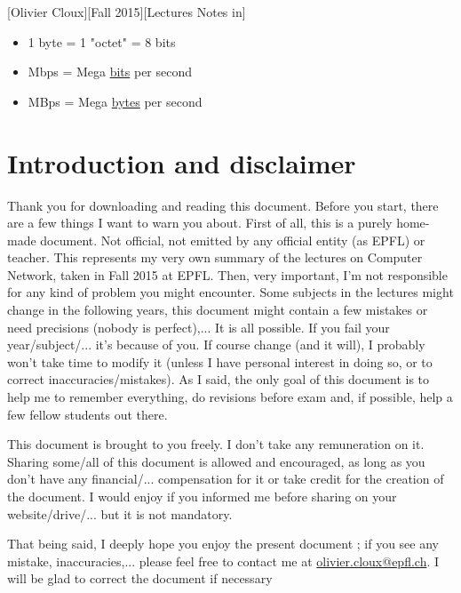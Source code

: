 \documentclass[12pt,a4paper]{article}
\begin{document}
[Olivier Cloux][Fall 2015][Lectures Notes in]
\newpage
\begin{multicols}{2}
	\tableofcontents
\end{multicols}
\setcounter{section}{-1}
\begin{boite}
	\begin{center}
	\end{center}
	\begin{itemize}
		\item 1 byte = 1 "octet" = 8 bits
		\item Mbps = Mega \uline{bits} per second
		\item MBps = Mega \uline{bytes} per second
	\end{itemize}
\end{boite}

\section{Introduction and disclaimer}
Thank you for downloading and reading this document. Before you start, there are a few things I want to warn you about. First of all, this is a purely home-made document. Not official, not emitted by any official entity (as EPFL) or teacher. This represents my very own summary of the lectures on Computer Network, taken in Fall 2015 at EPFL. Then, very important, I'm not responsible for any kind of problem you might encounter. Some subjects in the lectures might change in the following years, this document might contain a few mistakes or need precisions (nobody is perfect),... It is all possible. If you fail your year/subject/... it's because of you. If course change (and it will), I probably won't take time to modify it (unless I have personal interest in doing so, or to correct inaccuracies/mistakes). As I said, the only goal of this document is to help me to remember everything, do revisions before exam and, if possible, help a few fellow students out there. 

This document is brought to you freely. I don't take any remuneration on it. Sharing some/all of this document is allowed and encouraged, as long as you don't have any financial/... compensation for it or take credit for the creation of the document. I would enjoy if you informed me before sharing on your website/drive/... but it is not mandatory.

That being said, I deeply hope you enjoy the present document ; if you see any mistake, inaccuracies,... please feel free to contact me at \href{mailto:olivier.cloux@epfl.ch}{olivier.cloux@epfl.ch}. I will be glad to correct the document if necessary
\end{document}
